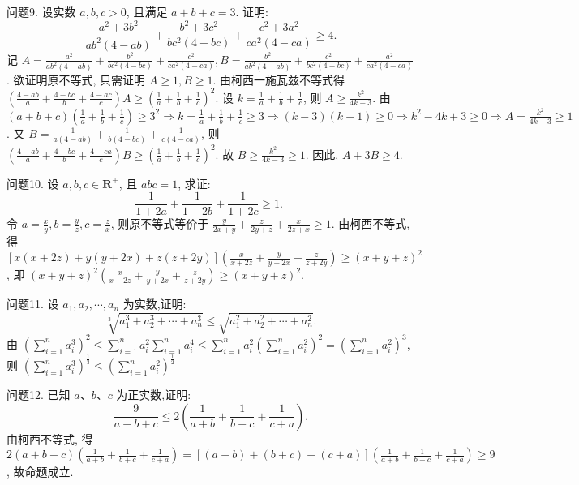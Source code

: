 问题9. 设实数 $a, b, c>0$, 且满足 $a+b+c=3$. 证明:
$$
\frac{a^2+3 b^2}{a b^2(4-a b)}+\frac{b^2+3 c^2}{b c^2(4-b c)}+\frac{c^2+3 a^2}{c a^2(4-c a)} \geqslant 4 .
$$
记 $A=\frac{a^2}{a b^2(4-a b)}+\frac{b^2}{b c^2(4-b c)}+\frac{c^2}{c a^2(4-c a)}, B=\frac{b^2}{a b^2(4-a b)} +\frac{c^2}{b c^2(4-b c)}+\frac{a^2}{c a^2(4-c a)}$. 欲证明原不等式, 只需证明 $A \geqslant 1, B \geqslant 1$. 由柯西一施瓦兹不等式得 $\left(\frac{4-a b}{a}+\frac{4-b c}{b}+\frac{4-a c}{c}\right) A \geqslant\left(\frac{1}{a}+\frac{1}{b}+\frac{1}{c}\right)^2$. 设 $k=\frac{1}{a}+\frac{1}{b}+\frac{1}{c}$, 则 $A \geqslant \frac{k^2}{4 k-3}$. 由 $(a+b+c)\left(\frac{1}{a}+\frac{1}{b}+\frac{1}{c}\right) \geqslant 3^2 \Rightarrow k= \frac{1}{a}+\frac{1}{b}+\frac{1}{c} \geqslant 3 \Rightarrow(k-3)(k-1) \geqslant 0 \Rightarrow k^2-4 k+3 \geqslant 0 \Rightarrow A=\frac{k^2}{4 k-3} \geqslant 1$. 又 $B=\frac{1}{a(4-a b)}+\frac{1}{b(4-b c)}+\frac{1}{c(4-c a)}$, 则 $\left(\frac{4-a b}{a}+\frac{4-b c}{b}+\frac{4-c a}{c}\right) B \geqslant\left(\frac{1}{a}+\frac{1}{b}+\frac{1}{c}\right)^2$. 故 $B \geqslant \frac{k^2}{4 k-3} \geqslant 1$. 因此, $A+3 B \geqslant 4$.



问题10. 设 $a, b, c \in \mathbf{R}^{+}$, 且 $a b c=1$, 求证:
$$
\frac{1}{1+2 a}+\frac{1}{1+2 b}+\frac{1}{1+2 c} \geqslant 1 \text {. }
$$
令 $a=\frac{x}{y}, b=\frac{y}{z}, c=\frac{z}{x}$, 则原不等式等价于 $\frac{y}{2 x+y}+\frac{z}{2 y+z}+ \frac{x}{2 z+x} \geqslant 1$. 由柯西不等式, 得 $[x(x+2 z)+y(y+2 x)+z(z+ 2 y)]\left(\frac{x}{x+2 z}+\frac{y}{y+2 x}+\frac{z}{z+2 y}\right) \geqslant(x+y+z)^2$, 即 $(x+y+ z)^2\left(\frac{x}{x+2 z}+\frac{y}{y+2 x}+\frac{z}{z+2 y}\right) \geqslant(x+y+z)^2$.



问题11. 设 $a_1, a_2, \cdots, a_n$ 为实数,证明:
$$
\sqrt[3]{a_1^3+a_2^3+\cdots+a_n^3} \leqslant \sqrt{a_1^2+a_2^2+\cdots+a_n^2} .
$$
由 $\left(\sum_{i=1}^n a_i^3\right)^2 \leqslant \sum_{i=1}^n a_i^2 \sum_{i=1}^n a_i^4 \leqslant \sum_{i=1}^n a_i^2\left(\sum_{i=1}^n a_i^2\right)^2=\left(\sum_{i=1}^n a_i^2\right)^3$, 则 $\left(\sum_{i=1}^n a_i^3\right)^{\frac{1}{3}} \leqslant\left(\sum_{i=1}^n a_i^2\right)^{\frac{1}{2}}$



问题12. 已知 $a 、 b 、 c$ 为正实数,证明:
$$
\frac{9}{a+b+c} \leqslant 2\left(\frac{1}{a+b}+\frac{1}{b+c}+\frac{1}{c+a}\right) .
$$
由柯西不等式, 得 $2(a+b+c)\left(\frac{1}{a+b}+\frac{1}{b+c}+\frac{1}{c+a}\right)=[(a+b)+(b+c)+(c+a)]\left(\frac{1}{a+b}+\frac{1}{b+c}+\frac{1}{c+a}\right) \geqslant 9$, 故命题成立.



